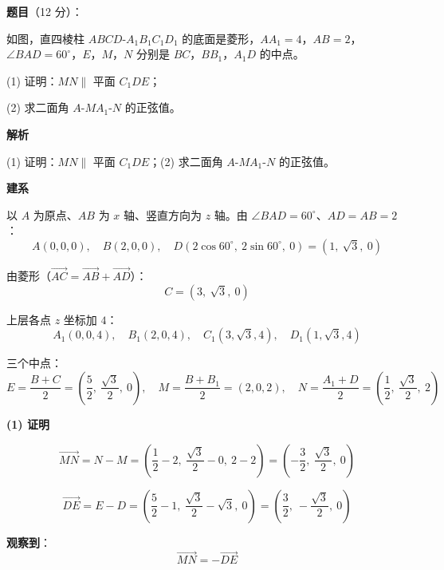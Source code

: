 \begin{answer}

\textbf{题目}（12 分）：

如图，直四棱柱 $ABCD\text{-}A_1B_1C_1D_1$ 的底面是菱形，$AA_1=4$，$AB=2$，$\angle BAD=60^\circ$，$E$，$M$，$N$ 分别是 $BC$，$BB_1$，$A_1D$ 的中点。
\nopagebreak[4]
\begin{center}\end{center}
\nopagebreak[4]
  (1) 证明：$MN\parallel$ 平面 $C_1DE$；

  (2) 求二面角 $A\text{-}MA_1\text{-}N$ 的正弦值。

\textbf{解析}

  (1) 证明：$MN\parallel$ 平面 $C_1DE$；(2) 求二面角 $A\text{-}MA_1\text{-}N$ 的正弦值。

\par\medskip

\textbf{建系}

以 $A$ 为原点、$AB$ 为 $x$ 轴、竖直方向为 $z$ 轴。由 $\angle BAD=60^\circ$、$AD=AB=2$：
\nopagebreak[4]
\[A(0,0,0),\quad B(2,0,0),\quad D\left(2\cos60^\circ,\ 2\sin60^\circ,\ 0\right)=\left(1,\ \sqrt3,\ 0\right)\]

由菱形（$\overrightarrow{AC}=\overrightarrow{AB}+\overrightarrow{AD}$）：
\nopagebreak[4]
\[C=\left(3,\ \sqrt3,\ 0\right)\]

上层各点 $z$ 坐标加 $4$：
\nopagebreak[4]
\[A_1(0,0,4),\quad B_1(2,0,4),\quad C_1\left(3,\sqrt3,4\right),\quad D_1\left(1,\sqrt3,4\right)\]

三个中点：
\nopagebreak[4]
\[E=\frac{B+C}2=\left(\frac52,\ \frac{\sqrt3}2,\ 0\right),\quad M=\frac{B+B_1}2=(2,0,2),\quad N=\frac{A_1+D}2=\left(\frac12,\ \frac{\sqrt3}2,\ 2\right)\]

\par\medskip

\textbf{(1) 证明}

\nopagebreak[4]
\[\overrightarrow{MN}=N-M=\left(\frac12-2,\ \frac{\sqrt3}2-0,\ 2-2\right)=\left(-\frac32,\ \frac{\sqrt3}2,\ 0\right)\]

\nopagebreak[4]
\[\overrightarrow{DE}=E-D=\left(\frac52-1,\ \frac{\sqrt3}2-\sqrt3,\ 0\right)=\left(\frac32,\ -\frac{\sqrt3}2,\ 0\right)\]

\textbf{观察到}：
\nopagebreak[4]
\[\overrightarrow{MN}=-\overrightarrow{DE}\]


\end{answer}
